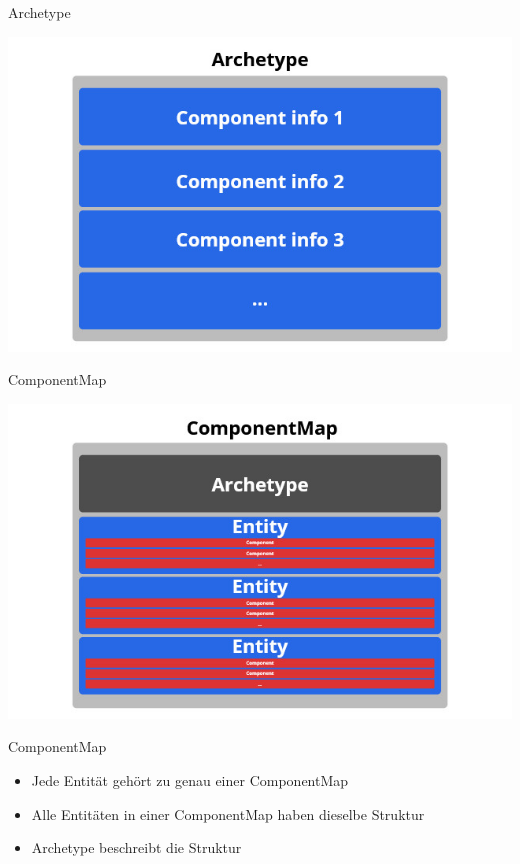 \documentclass{presentation}
\begin{document}
\begin{frame}{Archetype}
    \begin{center}
        \includegraphics[width=\textwidth]{archetype.jpg}
    \end{center}
\end{frame}

\begin{frame}{ComponentMap}
    \begin{center}
        \includegraphics[width=\textwidth]{componentmap.jpg}
    \end{center}
\end{frame}

\begin{frame}{ComponentMap}
    \begin{itemize}
        \item Jede Entität gehört zu genau einer ComponentMap
        \item Alle Entitäten in einer ComponentMap haben dieselbe Struktur
        \item Archetype beschreibt die Struktur
    \end{itemize}
\end{frame}
\end{document}
